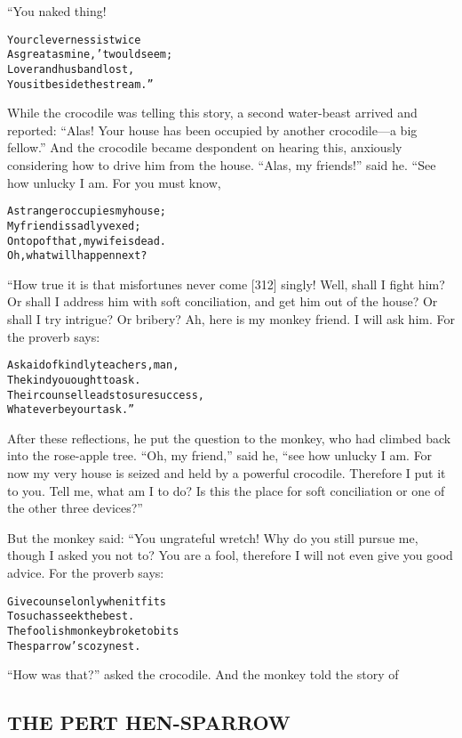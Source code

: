 \documentclass{article}
\renewenvironment{verbatim}{\begin{alltt}\normalfont\begin{centering}}{\end{centering}\end{alltt}}
\begin{document}
“You naked thing!

\begin{verbatim}
Your cleverness is twice
    As great as mine, 'twould seem;
Lover and husband lost,
    You sit beside the stream.”                         
\end{verbatim}
While the crocodile was telling this story, a second water-beast
arrived and reported:
``Alas! Your house has been occupied by another crocodile---a big fellow.''
And the crocodile became despondent on hearing this, anxiously
considering how to drive him from the house. ``Alas, my friends!''
said he. “See how unlucky I am. For you must know,

\begin{verbatim}
A stranger occupies my house;
    My friend is sadly vexed;
On top of that, my wife is dead.
    Oh, what will happen next?
\end{verbatim}
“How true it is that misfortunes never come [312] singly! Well,
shall I fight him? Or shall I address him with soft conciliation,
and get him out of the house? Or shall I try intrigue? Or bribery?
Ah, here is my monkey friend. I will ask him. For the proverb
says:

\begin{verbatim}
Ask aid of kindly teachers, man,
    The kind you ought to ask.
Their counsel leads to sure success,
    Whatever be your task.”
\end{verbatim}
After these reflections, he put the question to the monkey, who had
climbed back into the rose-apple tree. ``Oh, my friend,'' said he,
``see how unlucky I am. For now my very house is seized and held by a powerful crocodile. Therefore I put it to you. Tell me, what am I to do? Is this the place for soft conciliation or one of the other three devices?''

But the monkey said: “You ungrateful wretch! Why do you still
pursue me, though I asked you not to? You are a fool, therefore I
will not even give you good advice. For the proverb says:

\begin{verbatim}
Give counsel only when it fits
    To such as seek the best.
The foolish monkey broke to bits
    The sparrow's cozy nest.
\end{verbatim}
``How was that?'' asked the crocodile. And the monkey told the
story of

\subsection{THE PERT HEN-SPARROW}
\end{document}
